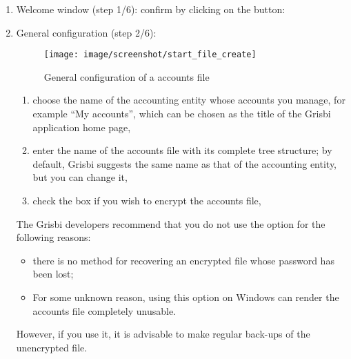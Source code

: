 \begin{enumerate}
	\item Welcome window (step 1/6): confirm by clicking on the  button:%
	\item General configuration (step 2/6):

\begin{figure}[htbp]
	\begin{center}
		\texttt{[image: image/screenshot/start\_file\_create]}
	\end{center}
	\caption{General configuration of a accounts file}
	\label{start_file_create}
\end{figure}



		\begin{enumerate}
			\item choose the name of the accounting entity whose accounts you manage, for example \enquote{My accounts}, which can be chosen as the title of the Grisbi application home page,%
			\item enter the name of the accounts file with its complete tree structure; by default, Grisbi suggests the same name as that of the accounting entity, but you can change it,%
			\item check the  box if you wish \gls{to encrypt} the accounts file,%
		\end{enumerate}

The Grisbi developers recommend that you do not use the  option for the following reasons:
\begin{itemize}
	\item there is no method for recovering an encrypted file whose password has been lost;
	\item For some unknown reason, using this option on Windows can render the accounts file completely unusable.
\end{itemize}  
However, if you use it, it is advisable to make regular back-ups of the unencrypted file.


\end{enumerate}
